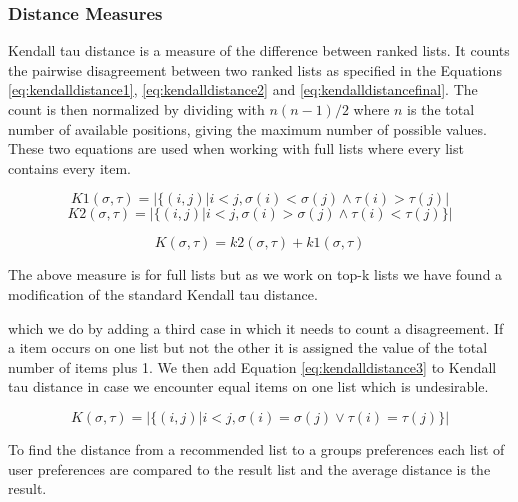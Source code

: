 \subsubsection{Distance Measures}\label{sec:distance}

Kendall tau distance is a measure of the difference between ranked lists\citep{rank:aggregation}. It counts the pairwise disagreement between two ranked lists as specified in the Equations \ref{eq:kendalldistance1}, \ref{eq:kendalldistance2} and \ref{eq:kendalldistancefinal}. The count is then normalized by dividing with $n(n-1)/2$ where $n$ is the total number of available positions, giving the maximum number of possible values. 
These two equations are used when working with full lists where every list contains every item. 

\begin{equation}\label{eq:kendalldistance1}
K1(\sigma,\tau) = | \{(i,j) | i < j, \sigma (i) < \sigma (j) \land \tau (i) > \tau (j)|
\end{equation}
\begin{equation}\label{eq:kendalldistance2}
K2(\sigma,\tau) = | \{(i,j) | i < j, \sigma (i) > \sigma (j) \land \tau (i) < \tau (j) \} |
\end{equation}

\begin{equation}\label{eq:kendalldistancefinal}
K(\sigma,\tau) = k2(\sigma,\tau) + k1(\sigma,\tau)
\end{equation}

The above measure is for full lists but as we work on top-k lists we have found a modification of the standard Kendall tau distance\cite{comparing:topk}. 

 which we do by adding a third case in which it needs to count a disagreement. If a item occurs on one list but not the other it is assigned the value of the total number of items plus 1. We then add Equation \ref{eq:kendalldistance3} to Kendall tau distance in case we encounter equal items on one list which is undesirable.

\begin{equation}\label{eq:kendalldistance3}
K(\sigma,\tau) = | \{(i,j) | i < j, \sigma (i) = \sigma (j) \lor \tau (i) = \tau (j) \} |
\end{equation}

To find the distance from a recommended list to a groups preferences each list of user preferences are compared to the result list and the average distance is the result. 




